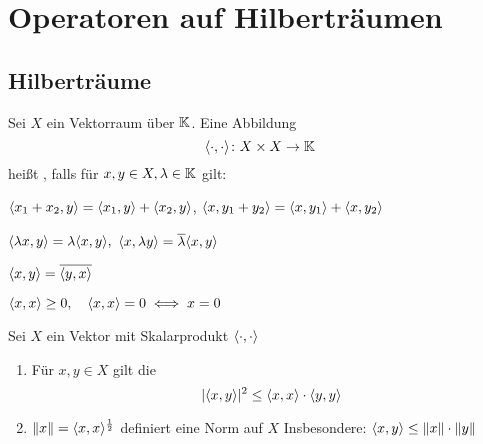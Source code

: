 

\chapter*{Operatoren auf Hilberträumen}  \setcounter{section}{14}



\section{Hilberträume}



\begin{definition} \label{def:15.1-Skalarprodukt}
	Sei $X$ ein Vektorraum über $\mathbb{K}$. Eine Abbildung
	\[ \langle \cdot, \cdot \rangle \colon X \times X \rightarrow \mathbb{K} \]
	hei{\ss}t , falls für $x, y \in X, \lambda \in \mathbb{K}$ gilt:
	\begin{description}
	 	\label{def:15.1i}
	 	\item[$\hspace{0.5cm} (S1) \hspace{0.1cm} $] $\langle x_{1} + x_{2}, y \rangle = \langle x_{1}, y \rangle + \langle x_{2}, y \rangle$, $\langle x, y_{1} + y_{2} \rangle = \langle x, y_{1} \rangle + \langle x, y_{2} \rangle$
 		\label{def:15.1ii}
	 	\item[$\hspace{0.5cm} (S2) \hspace{0.1cm} $] $\langle \lambda x, y \rangle = \lambda \langle x, y \rangle,$ $\langle x, \lambda y \rangle = \overline{\lambda} \langle x, y \rangle$
 		\label{def:15.1iii}
	 	\item[$\hspace{0.5cm} (S3) \hspace{0.1cm} $] $\langle x, y \rangle = \overline{\langle y, x \rangle }$
 		\label{def:15.1iv}
	 	\item[$\hspace{0.5cm} (S4) \hspace{0.1cm} $] $\langle x, x \rangle \geq 0, \quad \langle x, x \rangle = 0 \iff x = 0$
	\end{description}
\end{definition}


\begin{prop} \label{prop:15.2}
	Sei $X$ ein Vektor mit Skalarprodukt $\langle \cdot, \cdot \rangle$
	\begin{enumerate}[label=\alph*\upshape)] \label{prop:15.2a}
		\item Für $x, y \in X$ gilt die 
			\[ | \langle x, y \rangle |^{2} \leq \langle x, x \rangle \cdot \langle y, y \rangle \] \label{prop:15.2b}
		\item $\| x \| = \langle x, x \rangle^{\frac{1}{2}}$ definiert eine Norm auf $X$
			Insbesondere: $\langle x, y \rangle \leq \| x \| \cdot \| y \|$
	\end{enumerate}	
\end{prop}

